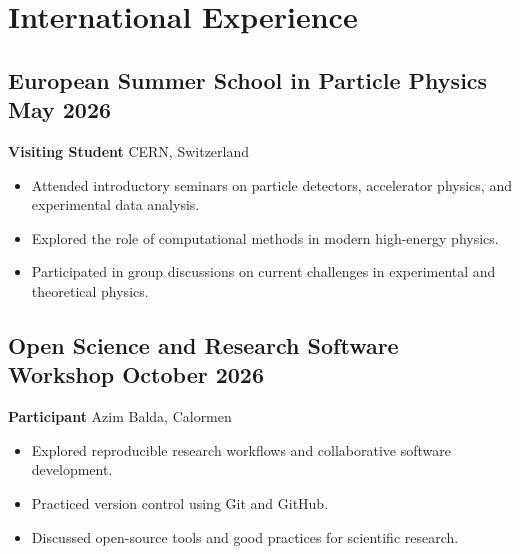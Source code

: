 \documentclass[11pt]{article}
\begin{document}

\section{
    \texorpdfstring{
    \makebox[\widthof{\faGlobe}][c]{
        \color{NA_Red}{\faGlobe}
    }\quad International Experience
    }
    {
    International Experience
    }
}

\subsection{
    \texorpdfstring{
    European Summer School in Particle Physics
    \hfill May 2026
    }
    {European Summer School in Particle Physics
    -- May 2026}
}

\textbf{Visiting Student}
\hfill CERN, Switzerland

\begin{itemize}
    \item Attended introductory seminars on particle detectors,
    accelerator physics, and experimental data analysis.
    \item Explored the role of computational methods in modern
    high-energy physics.
    \item Participated in group discussions on current challenges
    in experimental and theoretical physics.
\end{itemize}

\subsection{
    \texorpdfstring{
    Open Science and Research Software Workshop
    \hfill October 2026
    }
    {
    Open Science and Research Software Workshop
    -- October 2026
    }
}

\textbf{Participant}
\hfill Azim Balda, Calormen

\begin{itemize}
    \item Explored reproducible research workflows and collaborative
    software development.
    \item Practiced version control using Git and GitHub.
    \item Discussed open-source tools and good practices for
    scientific research.
\end{itemize}
\end{document}
